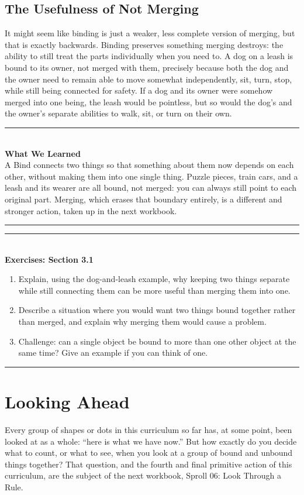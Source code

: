 \documentclass[11pt]{book}
\newenvironment{exercisebox}[1]{\vspace{0.8em}\noindent\rule{\linewidth}{0.6pt}\\[0.2em]\textbf{Exercises: #1}\\[0.3em]\begin{enumerate}[label=\arabic*., itemsep=0.4em]}{\end{enumerate}\noindent\rule{\linewidth}{0.6pt}\vspace{0.6em}}
\newenvironment{summarybox}{\vspace{0.6em}\noindent\rule{\linewidth}{0.6pt}\\[0.2em]\textbf{What We Learned}\\[0.3em]}{\\[0.2em]\noindent\rule{\linewidth}{0.6pt}\vspace{0.6em}}
\begin{document}
\section{The Usefulness of Not Merging}

It might seem like binding is just a weaker, less complete version of merging, but that is exactly backwards. Binding preserves something merging destroys: the ability to still treat the parts individually when you need to. A dog on a leash is bound to its owner, not merged with them, precisely because both the dog and the owner need to remain able to move somewhat independently, sit, turn, stop, while still being connected for safety. If a dog and its owner were somehow merged into one being, the leash would be pointless, but so would the dog's and the owner's separate abilities to walk, sit, or turn on their own.

\begin{summarybox}
A Bind connects two things so that something about them now depends on each other, without making them into one single thing. Puzzle pieces, train cars, and a leash and its wearer are all bound, not merged: you can always still point to each original part. Merging, which erases that boundary entirely, is a different and stronger action, taken up in the next workbook.
\end{summarybox}

\begin{exercisebox}{Section 3.1}
\item Explain, using the dog-and-leash example, why keeping two things separate while still connecting them can be more useful than merging them into one.
\item Describe a situation where you would want two things bound together rather than merged, and explain why merging them would cause a problem.
\item Challenge: can a single object be bound to more than one other object at the same time? Give an example if you can think of one.
\end{exercisebox}

\chapter*{Looking Ahead}

Every group of shapes or dots in this curriculum so far has, at some point, been looked at as a whole: ``here is what we have now.'' But how exactly do you decide what to count, or what to see, when you look at a group of bound and unbound things together? That question, and the fourth and final primitive action of this curriculum, are the subject of the next workbook, Sproll 06: Look Through a Rule.
\end{document}
